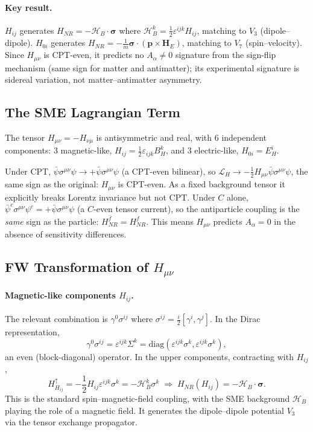 \documentclass[main]{subfiles}
\begin{document}
\paragraph{Key result.} $H_{ij}$ generates $H_{NR}=-\mathcal H_B\cdot\boldsymbol\sigma$
where $\mathcal H_B^k=\tfrac12\varepsilon^{ijk}H_{ij}$, matching to $V_3$
(dipole--dipole). $H_{0i}$ generates
$H_{NR}=-\tfrac1m\boldsymbol\sigma\cdot(\mathbf p\times\mathbf H_E)$, matching
to $V_7$ (spin--velocity). Since $H_{\mu\nu}$ is CPT-even, it predicts no
$A_\alpha\neq0$ signature from the sign-flip mechanism (same sign for matter
and antimatter); its experimental signature is sidereal variation, not
matter--antimatter asymmetry.

\subsection{The SME Lagrangian Term}

The tensor $H_{\mu\nu}=-H_{\nu\mu}$ is antisymmetric and real, with 6
independent components: 3 magnetic-like, $H_{ij}=\tfrac12\varepsilon_{ijk}B_H^k$,
and 3 electric-like, $H_{0i}=E_H^i$.

Under CPT, $\bar\psi\sigma^{\mu\nu}\psi\to+\bar\psi\sigma^{\mu\nu}\psi$ (a
CPT-even bilinear), so $\mathcal L_H\to-\tfrac12H_{\mu\nu}\bar\psi\sigma^{\mu\nu}\psi$,
the same sign as the original: $H_{\mu\nu}$ is CPT-even. As a fixed
background tensor it explicitly breaks Lorentz invariance but not CPT. Under
$C$ alone, $\bar\psi^c\sigma^{\mu\nu}\psi^c=+\bar\psi\sigma^{\mu\nu}\psi$
(a $C$-even tensor current), so the antiparticle coupling is the
\emph{same} sign as the particle: $H_{NR}^{\bar f}=H_{NR}^f$. This means
$H_{\mu\nu}$ predicts $A_\alpha=0$ in the absence of sensitivity differences.

\subsection{FW Transformation of \texorpdfstring{$H_{\mu\nu}$}{H\_mu\_nu}}

\paragraph{Magnetic-like components $H_{ij}$.} The relevant combination is
$\gamma^0\sigma^{ij}$ where $\sigma^{ij}=\tfrac{i}{2}[\gamma^i,\gamma^j]$. In
the Dirac representation,
\begin{equation}
  \gamma^0\sigma^{ij} = \varepsilon^{ijk}\Sigma^k
  = \mathrm{diag}\!\left(\varepsilon^{ijk}\sigma^k,\varepsilon^{ijk}\sigma^k\right),
\end{equation}
an even (block-diagonal) operator. In the upper components, contracting with
$H_{ij}$,
\begin{equation}
  H_{H_{ij}}^\uparrow = -\frac12 H_{ij}\varepsilon^{ijk}\sigma^k
  = -\mathcal H_B^k\sigma^k
  \;\Longrightarrow\;
  \boxed{H_{NR}(H_{ij}) = -\boldsymbol{\mathcal H}_B\cdot\boldsymbol\sigma.}
\end{equation}
This is the standard spin--magnetic-field coupling, with the SME background
$\boldsymbol{\mathcal H}_B$ playing the role of a magnetic field. It
generates the dipole--dipole potential $V_3$ via the tensor exchange
propagator.
\end{document}
